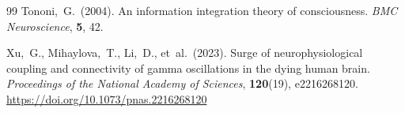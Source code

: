 \documentclass[11pt,a4paper]{article}
\theoremstyle{plain}
\theoremstyle{definition}
\theoremstyle{remark}
\begin{document}
\begin{thebibliography}{99}
Tononi,~G.\ (2004).
An information integration theory of consciousness.
\textit{BMC Neuroscience}, \textbf{5}, 42.

Xu,~G., Mihaylova,~T., Li,~D., et~al.\ (2023).
Surge of neurophysiological coupling and connectivity of gamma oscillations in the dying human brain.
\textit{Proceedings of the National Academy of Sciences}, \textbf{120}(19), e2216268120.
\url{https://doi.org/10.1073/pnas.2216268120}

\end{thebibliography}
\end{document}
